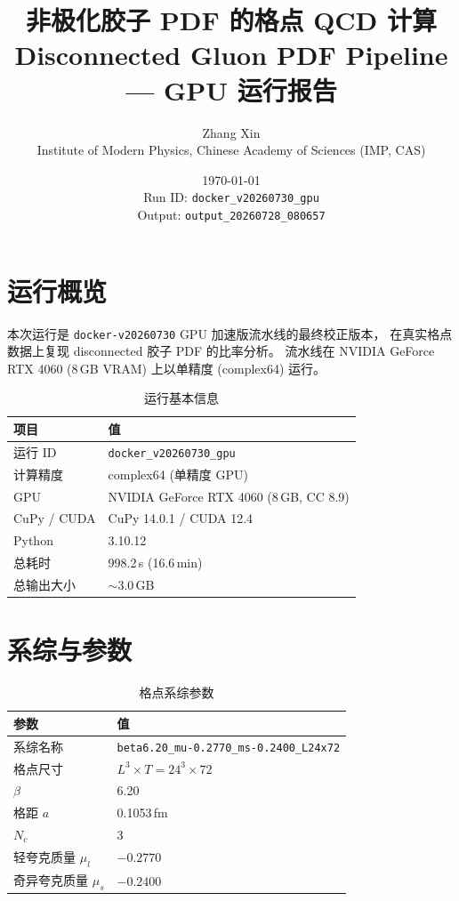 \documentclass[12pt,a4paper]{ctexart}
\title{
  \textbf{非极化胶子 PDF 的格点 QCD 计算} \\[4pt]
  \large Disconnected Gluon PDF Pipeline — GPU 运行报告
}
\author{
  Zhang Xin \\
  Institute of Modern Physics, Chinese Academy of Sciences (IMP, CAS)
}
\date{\today \\[4pt] Run ID: \texttt{docker\_v20260730\_gpu} \\ Output: \texttt{output\_20260728\_080657}}
\begin{document}
\maketitle
\thispagestyle{empty}

\section{运行概览}

本次运行是 \texttt{docker-v20260730} GPU 加速版流水线的最终校正版本，
在真实格点数据上复现 disconnected 胶子 PDF 的比率分析。
流水线在 NVIDIA GeForce RTX 4060 (8\,GB VRAM) 上以单精度 (complex64) 运行。

\begin{table}[htbp]
\centering
\caption{运行基本信息}
\label{tab:overview}
\begin{tabular}{ll}
\toprule
\textbf{项目}                      & \textbf{值} \\
\midrule
运行 ID                            & \texttt{docker\_v20260730\_gpu} \\
计算精度                           & complex64 (单精度 GPU) \\
GPU                                & NVIDIA GeForce RTX 4060 (8\,GB, CC 8.9) \\
CuPy / CUDA                        & CuPy 14.0.1 / CUDA 12.4 \\
Python                             & 3.10.12 \\
总耗时                             & 998.2\,s (16.6\,min) \\
总输出大小                         & $\sim$3.0\,GB \\
\bottomrule
\end{tabular}
\end{table}

\section{系综与参数}

\begin{table}[htbp]
\centering
\caption{格点系综参数}
\label{tab:ensemble}
\begin{tabular}{ll}
\toprule
\textbf{参数} & \textbf{值} \\
\midrule
系综名称 & \texttt{beta6.20\_mu-0.2770\_ms-0.2400\_L24x72} \\
格点尺寸 & $L^3 \times T = 24^3 \times 72$ \\
$\beta$  & 6.20 \\
格距 $a$ & 0.1053\,fm \\
$N_c$    & 3 \\
轻夸克质量 $\mu_l$ & $-0.2770$ \\
奇异夸克质量 $\mu_s$ & $-0.2400$ \\
\bottomrule
\end{tabular}
\end{table}
\end{document}
